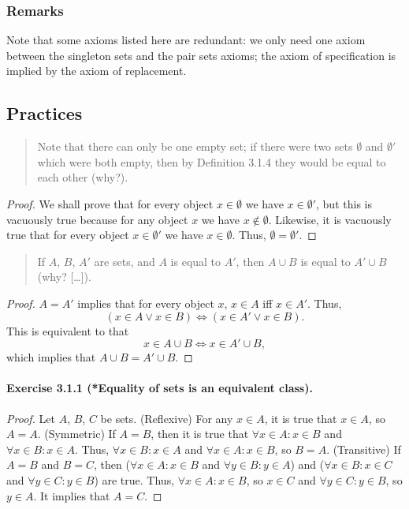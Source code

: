 \subsubsection{Remarks}
Note that some axioms listed here are redundant: we only need one axiom between the singleton sets and the pair sets axioms; the axiom of specification is implied by the axiom of replacement.

\subsection{Practices}
\begin{quote}
    Note that there can only be one empty set; if there were two sets $\emptyset$ and $\emptyset'$ which were both empty, then by Definition 3.1.4 they would be equal to each other (why?).
\end{quote}
\begin{proof}
    We shall prove that for every object $x \in \emptyset$ we have $x \in \emptyset'$, but this is vacuously true because for any object $x$ we have $x \notin \emptyset$. Likewise, it is vacuously true that for every object $x \in \emptyset'$ we have $x \in \emptyset$. Thus, $\emptyset = \emptyset'$.
\end{proof}

\begin{quote}
    If $A$, $B$, $A'$ are sets, and $A$ is equal to $A'$, then $A \cup B$ is equal to $A' \cup B$ (why? [\ldots]).
\end{quote}
\begin{proof}
    $A=A'$ implies that for every object $x$, $x\in A$ iff $x\in A'$. Thus, \[(x\in A \lor x\in B) \iff (x\in A' \lor x\in B).\] This is equivalent to that \[x\in A\cup B \iff x\in A'\cup B,\] which implies that $A\cup B = A'\cup B$.
\end{proof}

\paragraph{Exercise 3.1.1 (*Equality of sets is an equivalent class).}
\begin{proof}
    Let $A$, $B$, $C$ be sets.
    (Reflexive) For any $x \in A$, it is true that $x \in A$, so $A=A$.
    (Symmetric) If $A=B$, then it is true that $\forall x \in A : x \in B$ and $\forall x \in B : x \in A$. Thus, $\forall x \in B : x \in A$ and $\forall x \in A : x \in B$, so $B=A$.
    (Transitive) If $A=B$ and $B=C$, then ($\forall x \in A : x \in B$ and $\forall y \in B : y \in A$) and ($\forall x \in B : x \in C$ and $\forall y \in C : y \in B$) are true. Thus, $\forall x \in A : x \in B$, so $x\in C$ and $\forall y \in C : y \in B$, so $y \in A$. It implies that $A=C$.
\end{proof}


